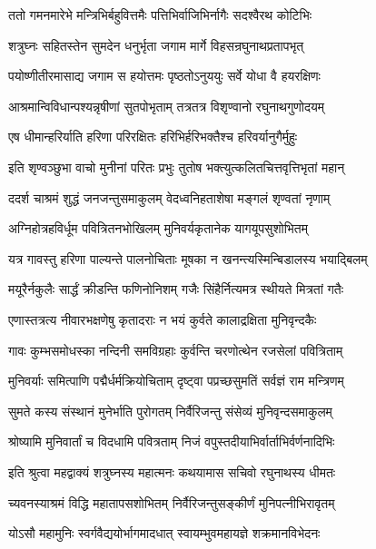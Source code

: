 \twolineshloka
{ततो गमनमारेभे मन्त्रिभिर्बहुवित्तमैः}
{पत्तिभिर्वाजिभिर्नागैः सदश्वैरथ कोटिभिः}%

\twolineshloka
{शत्रुघ्नः सहितस्तेन सुमदेन धनुर्भृता}
{जगाम मार्गे विहसन्रघुनाथप्रतापभृत्}%

\twolineshloka
{पयोष्णीतीरमासाद्य जगाम स हयोत्तमः}
{पृष्ठतोऽनुययुः सर्वे योधा वै हयरक्षिणः}%

\twolineshloka
{आश्रमान्विविधान्पश्यन्नृषीणां सुतपोभृताम्}
{तत्रतत्र विशृण्वानो रघुनाथगुणोदयम्}%

\twolineshloka
{एष धीमान्हरिर्याति हरिणा परिरक्षितः}
{हरिभिर्हरिभक्तैश्च हरिवर्यानुगैर्मुहुः}%

\twolineshloka
{इति शृण्वञ्छुभा वाचो मुनीनां परितः प्रभुः}
{तुतोष भक्त्युत्कलितचित्तवृत्तिभृतां महान्}%

\twolineshloka
{ददर्श चाश्रमं शुद्धं जनजन्तुसमाकुलम्}
{वेदध्वनिहताशेषा मङ्गलं शृण्वतां नृणाम्}%

\twolineshloka
{अग्निहोत्रहविर्धूम पवित्रितनभोखिलम्}
{मुनिवर्यकृतानेक यागयूपसुशोभितम्}%

\twolineshloka
{यत्र गावस्तु हरिणा पाल्यन्ते पालनोचिताः}
{मूषका न खनन्त्यस्मिन्बिडालस्य भयाद्बिलम्}%

\twolineshloka
{मयूरैर्नकुलैः सार्द्धं क्रीडन्ति फणिनोनिशम्}
{गजैः सिंहैर्नित्यमत्र स्थीयते मित्रतां गतैः}%

\twolineshloka
{एणास्तत्रत्य नीवारभक्षणेषु कृतादराः}
{न भयं कुर्वते कालाद्रक्षिता मुनिवृन्दकैः}%

\twolineshloka
{गावः कुम्भसमोधस्का नन्दिनी समविग्रहाः}
{कुर्वन्ति चरणोत्थेन रजसेलां पवित्रिताम्}%

\twolineshloka
{मुनिवर्याः समित्पाणि पद्मैर्धर्मक्रियोचिताम्}
{दृष्ट्वा पप्रच्छसुमतिं सर्वज्ञं राम मन्त्रिणम्}%


\twolineshloka
{सुमते कस्य संस्थानं मुनेर्भाति पुरोगतम्}
{निर्वैरिजन्तु संसेव्यं मुनिवृन्दसमाकुलम्}%

\twolineshloka
{श्रोष्यामि मुनिवार्तां च विदधामि पवित्रताम्}
{निजं वपुस्तदीयाभिर्वार्ताभिर्वर्णनादिभिः}%

\twolineshloka
{इति श्रुत्वा महद्वाक्यं शत्रुघ्नस्य महात्मनः}
{कथयामास सचिवो रघुनाथस्य धीमतः}%


\twolineshloka
{च्यवनस्याश्रमं विद्धि महातापसशोभितम्}
{निर्वैरिजन्तुसङ्कीर्णं मुनिपत्नीभिरावृतम्}%

\twolineshloka
{योऽसौ महामुनिः स्वर्गवैद्ययोर्भागमादधात्}
{स्वायम्भुवमहायज्ञे शक्रमानविभेदनः}%

